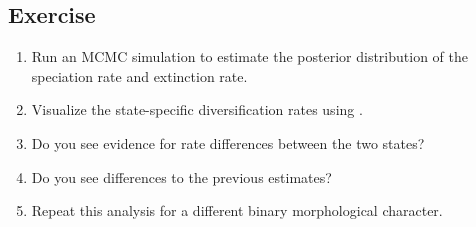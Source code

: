 


\subsection{Exercise}

\begin{enumerate}
\item Run an MCMC simulation to estimate the posterior distribution of the speciation rate and extinction rate.
\item Visualize the state-specific diversification rates using \R.
\item Do you see evidence for rate differences between the two states?
\item Do you see differences to the previous \BiSSE estimates?
\item Repeat this analysis for a different binary morphological character.
\end{enumerate}


\bigskip



